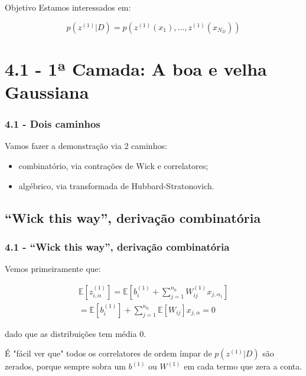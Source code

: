 \documentclass{beamer}
\begin{document}
\begin{frame}{Objetivo}
    Estamos interessados em:

    $$
    p(z^{(1)}|D) = p(z^{(1)}(x_1),\dots,z^{(1)}(x_{N_D}))
    $$

\end{frame}

\section{4.1 - 1ª Camada: A boa e velha Gaussiana}    
\begin{frame}
\tableofcontents[currentsection]
\end{frame}

\begin{frame}
    \frametitle{4.1 - Dois caminhos}

    Vamos fazer a demonstração via 2 caminhos:

    \begin{itemize}
        \item combinatório, via contrações de Wick e correlatores;
        \item algébrico, via transformada de Hubbard-Stratonovich.
    \end{itemize}

\end{frame}


\subsection{``Wick this way'', derivação combinatória}
\begin{frame}
\tableofcontents[currentsubsection]
\end{frame}

\begin{frame}
    \frametitle{4.1 - ``Wick this way'', derivação combinatória}

    Vemos primeiramente que:

    \begin{align*}
        \mathbb E[z_{i,\alpha}^{(1)}] = \mathbb E[b_i^{(1)} + \sum_{j=1}^{n_0}W_{ij}^{(1)}x_{j,\alpha_1}] \\
        = \mathbb E[b_i^{(1)}] + \sum_{j=1}^{n_0} \mathbb E[W_{ij}] x_{j,\alpha} = 0        
    \end{align*}

    dado que as distribuições tem média 0.

    É "fácil ver que" todos os correlatores de ordem ímpar de $p(z^{(1)}| D)$ são zerados, porque sempre sobra um $b^{(1)}$ ou $W^{(1)}$ em cada termo que zera a conta.

\end{frame}
\end{document}
